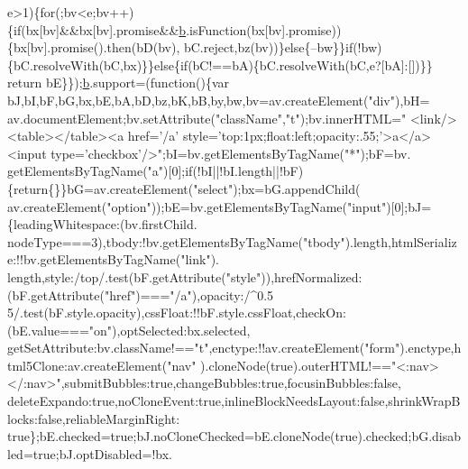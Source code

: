 \begin{DoxyCode}
      e>1)\{\textcolor{keywordflow}{for}(;bv<e;bv++)\{\textcolor{keywordflow}{if}(bx[bv]&&bx[bv].promise&&\hyperlink{a00039_aa4026ad5544b958e54ce5e106fa1c805}{b}.isFunction(bx[bv].promise))\{bx[bv].promise().then(bD(bv),
      bC.reject,bz(bv))\}\textcolor{keywordflow}{else}\{--bw\}\}\textcolor{keywordflow}{if}(!bw)\{bC.resolveWith(bC,bx)\}\}\textcolor{keywordflow}{else}\{\textcolor{keywordflow}{if}(bC!==bA)\{bC.resolveWith(bC,e?[bA]:[])\}\}\textcolor{keywordflow}{
      return} bE\}\});\hyperlink{a00039_aa4026ad5544b958e54ce5e106fa1c805}{b}.support=(\textcolor{keyword}{function}()\{var bJ,bI,bF,bG,bx,bE,bA,bD,bz,bK,bB,by,bw,bv=av.createElement(\textcolor{stringliteral}{"div"}),bH=
      av.documentElement;bv.setAttribute(\textcolor{stringliteral}{"className"},\textcolor{stringliteral}{"t"});bv.innerHTML=\textcolor{stringliteral}{"   <link/><table></table><a href='/a'
       style='top:1px;float:left;opacity:.55;'>a</a><input type='checkbox'/>"};bI=bv.getElementsByTagName(\textcolor{stringliteral}{"*"});bF=bv.
      getElementsByTagName(\textcolor{stringliteral}{"a"})[0];\textcolor{keywordflow}{if}(!bI||!bI.length||!bF)\{\textcolor{keywordflow}{return}\{\}\}bG=av.createElement(\textcolor{stringliteral}{"select"});bx=bG.appendChild(
      av.createElement(\textcolor{stringliteral}{"option"}));bE=bv.getElementsByTagName(\textcolor{stringliteral}{"input"})[0];bJ=\{leadingWhitespace:(bv.firstChild.
      nodeType===3),tbody:!bv.getElementsByTagName(\textcolor{stringliteral}{"tbody"}).length,htmlSerialize:!!bv.getElementsByTagName(\textcolor{stringliteral}{"link"}).
      length,style:/top/.test(bF.getAttribute(\textcolor{stringliteral}{"style"})),hrefNormalized:(bF.getAttribute(\textcolor{stringliteral}{"href"})===\textcolor{stringliteral}{"/a"}),opacity:/^0.5
      5/.test(bF.style.opacity),cssFloat:!!bF.style.cssFloat,checkOn:(bE.value===\textcolor{stringliteral}{"on"}),optSelected:bx.selected,
      getSetAttribute:bv.className!==\textcolor{stringliteral}{"t"},enctype:!!av.createElement(\textcolor{stringliteral}{"form"}).enctype,html5Clone:av.createElement(\textcolor{stringliteral}{"nav"}
      ).cloneNode(\textcolor{keyword}{true}).outerHTML!==\textcolor{stringliteral}{"<:nav></:nav>"},submitBubbles:\textcolor{keyword}{true},changeBubbles:\textcolor{keyword}{true},focusinBubbles:\textcolor{keyword}{false},
      deleteExpando:\textcolor{keyword}{true},noCloneEvent:\textcolor{keyword}{true},inlineBlockNeedsLayout:\textcolor{keyword}{false},shrinkWrapBlocks:\textcolor{keyword}{false},reliableMarginRight:\textcolor{keyword}{
      true}\};bE.checked=\textcolor{keyword}{true};bJ.noCloneChecked=bE.cloneNode(\textcolor{keyword}{true}).checked;bG.disabled=\textcolor{keyword}{true};bJ.optDisabled=!bx.

\end{DoxyCode}
